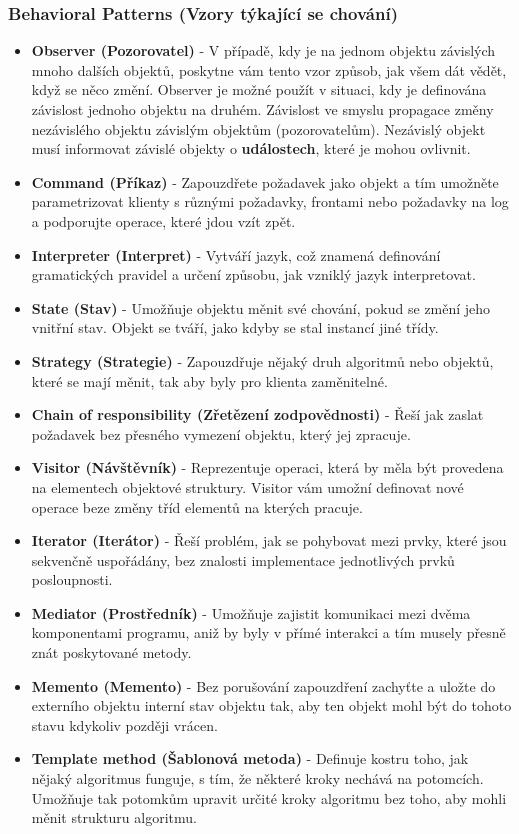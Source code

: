 \subsubsection{Behavioral Patterns (Vzory týkající se chování)}
\begin{itemize}
	\item \textbf{Observer (Pozorovatel)} - V případě, kdy je na jednom objektu závislých mnoho dalších objektů, poskytne vám tento vzor způsob, jak všem dát vědět, když se něco změní. Observer je možné použít v situaci, kdy je definována závislost jednoho objektu na druhém. Závislost ve smyslu propagace změny nezávislého objektu závislým objektům (pozorovatelům). Nezávislý objekt musí informovat závislé objekty o \textbf{událostech}, které je mohou ovlivnit.
	\item \textbf{Command (Příkaz)} - Zapouzdřete požadavek jako objekt a tím umožněte parametrizovat klienty s různými požadavky, frontami nebo požadavky na log a podporujte operace, které jdou vzít zpět.
	\item \textbf{Interpreter (Interpret)} - Vytváří jazyk, což znamená definování gramatických pravidel a určení způsobu, jak vzniklý jazyk interpretovat.
	\item \textbf{State (Stav)} - Umožňuje objektu měnit své chování, pokud se změní jeho vnitřní stav. Objekt se tváří, jako kdyby se stal instancí jiné třídy.
	\item \textbf{Strategy (Strategie)} - Zapouzdřuje nějaký druh algoritmů nebo objektů, které se mají měnit, tak aby byly pro klienta zaměnitelné.
	\item \textbf{Chain of responsibility (Zřetězení zodpovědnosti)} - Řeší jak zaslat požadavek bez přesného vymezení objektu, který jej zpracuje.
	\item \textbf{Visitor (Návštěvník)} - Reprezentuje operaci, která by měla být provedena na elementech objektové struktury. Visitor vám umožní definovat nové operace beze změny tříd elementů na kterých pracuje.
	\item \textbf{Iterator (Iterátor)} - Řeší problém, jak se pohybovat mezi prvky, které jsou sekvenčně uspořádány, bez znalosti implementace jednotlivých prvků posloupnosti.
	\item \textbf{Mediator (Prostředník)} - Umožňuje zajistit komunikaci mezi dvěma komponentami programu, aniž by byly v přímé interakci a tím musely přesně znát poskytované metody.
	\item \textbf{Memento (Memento)} - Bez porušování zapouzdření zachyťte a uložte do externího objektu interní stav objektu tak, aby ten objekt mohl být do tohoto stavu kdykoliv později vrácen.
	\item \textbf{Template method (Šablonová metoda)} - Definuje kostru toho, jak nějaký algoritmus funguje, s tím, že některé kroky nechává na potomcích. Umožňuje tak potomkům upravit určité kroky algoritmu bez toho, aby mohli měnit strukturu algoritmu.
\end{itemize}
